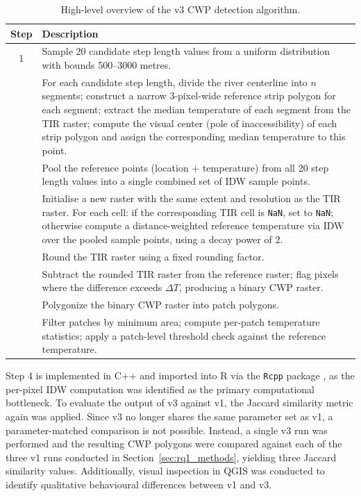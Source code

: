 \begin{table}[H]
	\centering
	\caption{High-level overview of the v3 CWP detection algorithm.}
	\label{tab:cwp_pseudocode_v3}
	\begin{tabular}{@{}c p{11.5cm}@{}}
		\toprule
		\textbf{Step} & \textbf{Description} \\
		\midrule
		1 & Sample 20 candidate step length values from a uniform distribution 
		with bounds 500--3000 metres. \\
		\addlinespace
		2 & For each candidate step length, divide the river centerline into $n$ 
		segments; construct a narrow 3-pixel-wide reference strip polygon for 
		each segment; extract the median temperature of each segment from the 
		TIR raster; compute the visual center (pole of inaccessibility) of each strip polygon and assign 
		the corresponding median temperature to this point. \\
		\addlinespace
		3 & Pool the reference points (location + temperature) from all 20 step 
		length values into a single combined set of IDW sample points. \\
		\addlinespace
		4 & Initialise a new raster with the same extent and resolution as the 
		TIR raster. For each cell: if the corresponding TIR cell is 
		\texttt{NaN}, set to \texttt{NaN}; otherwise compute a 
		distance-weighted reference temperature via IDW over the pooled 
		sample points, using a decay power of 2. \\
		\addlinespace
		5 & Round the TIR raster using a fixed rounding factor. \\
		\addlinespace
		6 & Subtract the rounded TIR raster from the reference raster; flag 
		pixels where the difference exceeds $\Delta T$, producing a binary 
		CWP raster. \\
		\addlinespace
		7 & Polygonize the binary CWP raster into patch polygons. \\
		\addlinespace
		8 & Filter patches by minimum area; compute per-patch temperature 
		statistics; apply a patch-level threshold check against the reference 
		temperature. \\
		\bottomrule
	\end{tabular}
\end{table}

Step 4 is implemented in C++ and imported into R via the \texttt{Rcpp}  package \citep{Rcpp}, 
as the per-pixel IDW computation was identified as the primary computational 
bottleneck. To evaluate the output of v3 against v1, the Jaccard similarity 
metric again was applied. Since v3 no 
longer shares the same parameter set as v1, a parameter-matched comparison is 
not possible. Instead, a single v3 run was performed and the resulting CWP 
polygons were compared against each of the three v1 runs conducted in 
Section~\ref{sec:rq1_methods}, yielding three Jaccard similarity values. 
Additionally, visual inspection in QGIS was conducted to identify qualitative 
behavioural differences between v1 and v3.


